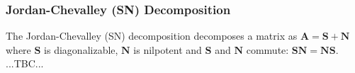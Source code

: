 


\subsubsection{Jordan-Chevalley (SN) Decomposition}
The Jordan-Chevalley (SN) decomposition decomposes a matrix as $\mathbf{A} =  \mathbf{S + N}$ where $\mathbf{S}$ is diagonalizable, $\mathbf{N}$ is nilpotent and $\mathbf{S}$ and $\mathbf{N}$ commute:
$\mathbf{SN} = \mathbf{NS}$. ...TBC...

